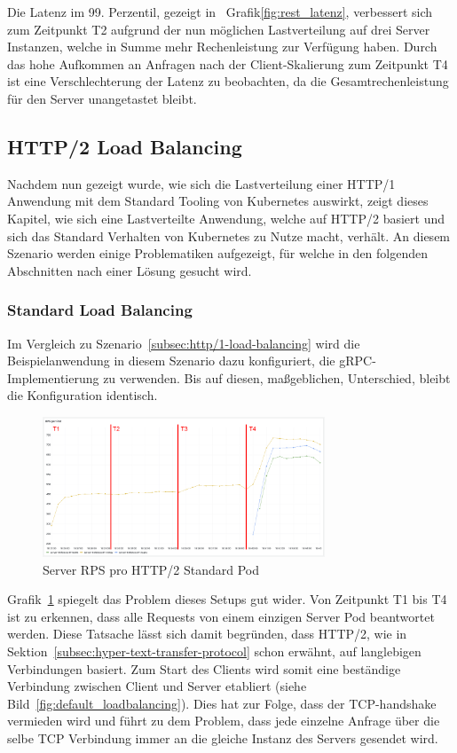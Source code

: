 Die Latenz im 99. Perzentil, gezeigt in~ Grafik\ref{fig:rest_latenz}, verbessert sich zum Zeitpunkt T2 aufgrund der nun möglichen Lastverteilung auf drei Server Instanzen, welche in Summe mehr Rechenleistung zur Verfügung haben.
Durch das hohe Aufkommen an Anfragen nach der Client-Skalierung zum Zeitpunkt T4 ist eine Verschlechterung der Latenz zu beobachten, da die Gesamtrechenleistung für den Server unangetastet bleibt.

\subsection{HTTP/2 Load Balancing}\label{subsec:http/2-load-balancing}

Nachdem nun gezeigt wurde, wie sich die Lastverteilung einer HTTP/1 Anwendung mit dem Standard Tooling von Kubernetes auswirkt, zeigt dieses Kapitel, wie sich eine Lastverteilte Anwendung, welche auf HTTP/2 basiert und sich das Standard Verhalten von Kubernetes zu Nutze macht, verhält.
An diesem Szenario werden einige Problematiken aufgezeigt, für welche in den folgenden Abschnitten nach einer Lösung gesucht wird.

\subsubsection{Standard Load Balancing}\label{subsubsec:standard}

Im Vergleich zu Szenario~\ref{subsec:http/1-load-balancing} wird die Beispielanwendung in diesem Szenario dazu konfiguriert, die gRPC-Implementierung zu verwenden.
Bis auf diesen, maßgeblichen, Unterschied, bleibt die Konfiguration identisch.

\begin{figure}[H]
    \centering
    \includegraphics[width=0.75\textwidth]{img/default_rps}
    \caption{Server RPS pro HTTP/2 Standard Pod}
    \label{fig:default_rps}
\end{figure}

Grafik~\ref{fig:default_rps} spiegelt das Problem dieses Setups gut wider.
Von Zeitpunkt T1 bis T4 ist zu erkennen, dass alle Requests von einem einzigen Server Pod beantwortet werden.
Diese Tatsache lässt sich damit begründen, dass HTTP/2, wie in Sektion~\ref{subsec:hyper-text-transfer-protocol} schon erwähnt, auf langlebigen Verbindungen basiert.
Zum Start des Clients wird somit eine beständige Verbindung zwischen Client und Server etabliert (siehe Bild~\ref{fig:default_loadbalancing}).
Dies hat zur Folge, dass der TCP-handshake vermieden wird und führt zu dem Problem, dass jede einzelne Anfrage über die selbe TCP Verbindung immer an die gleiche Instanz des Servers gesendet wird.

